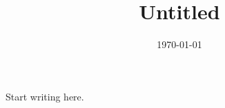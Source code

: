 \documentclass{article}
\title{Untitled}
\author{}
\date{\today}
\begin{document}
\maketitle

Start writing here.
\end{document}
